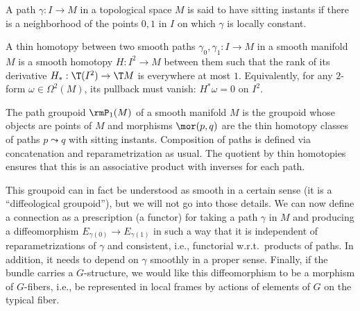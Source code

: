 \begin{defn}
    A path $\gamma:I\to M$ in a topological space $M$ is said to have sitting instants if there is a neighborhood of the points $0,1$ in $I$ on which $\gamma$ is locally constant.
\end{defn}

\begin{defn}
    A thin homotopy between two smooth paths $\gamma_0,\gamma_1:I\to M$ in a smooth manifold $M$ is a smooth homotopy $H:I^2\to M$ between them such that the rank of its derivative $H_\ast:\T(I^2)\to \T M$ is everywhere at most $1$. Equivalently, for any $2$-form $\omega\in\Omega^2(M)$, its pullback must vanish: $H^\ast \omega=0$ on $I^2$.
\end{defn}

\begin{defn}
    The path groupoid $\rmP_1(M)$ of a smooth manifold $M$ is the groupoid whose objects are points of $M$ and morphisms $\mor(p,q)$ are the thin homotopy classes of paths $p\leadsto q$ with sitting instants. Composition of paths is defined via concatenation and reparametrization as usual. The quotient by thin homotopies ensures that this is an associative product with inverses for each path.
\end{defn}

This groupoid can in fact be understood as smooth in a certain sense (it is a ``diffeological groupoid''), but we will not go into those details. We can now define a connection as a prescription (a functor) for taking a path $\gamma$ in $M$ and producing a diffeomorphism $E_{\gamma(0)}\to E_{\gamma(1)}$ in such a way that it is independent of reparametrizations of $\gamma$ and consistent, i.e., functorial w.r.t.\ products of paths. In addition, it needs to depend on $\gamma$ smoothly in a proper sense. Finally, if the bundle carries a $G$-structure, we would like this diffeomorphism to be a morphism of $G$-fibers, i.e., be represented in local frames by actions of elements of $G$ on the typical fiber.

